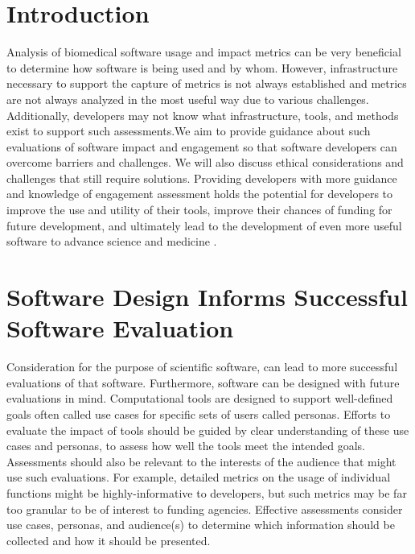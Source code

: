 \documentclass{article}
\begin{document}
\section{Introduction}
Analysis of biomedical software usage and impact metrics can be very beneficial to determine how software is being used and by whom. However, infrastructure necessary to support the capture of metrics is not always established and metrics are not always analyzed in the most useful way due to various challenges. Additionally, developers may not know what infrastructure, tools, and methods exist to support such assessments.We aim to provide guidance about such evaluations of software impact and engagement so that software developers can overcome barriers and challenges. We will also discuss ethical considerations and challenges that still require solutions. Providing developers with more guidance and knowledge of engagement assessment holds the potential for developers to improve the use and utility of their tools, improve their chances of funding for future development, and ultimately lead to the development of even more useful software to advance science and medicine \cite{wratten_reproducible_2021}. 


\section{Software Design Informs Successful Software Evaluation}
\label{sec:headings}
Consideration for the purpose of scientific software, can lead to more successful evaluations of that software. Furthermore, software can be designed with future evaluations in mind. Computational tools are designed to support well-defined goals often called use cases \cite{gamma_design_1995} for specific sets of users called personas\cite{cooper_inmates_2004}. Efforts to evaluate the impact of tools should be guided by clear understanding of these use cases and personas, to assess how well the tools meet the intended goals.  Assessments should also be relevant to the interests of the audience that might use such evaluations. For example, detailed metrics on the usage of individual functions might be highly-informative to developers, but such metrics may be far too granular to be of interest to funding agencies.  Effective assessments consider use cases, personas, and audience(s) to determine which information should be collected and how it should be presented. 
\end{document}
